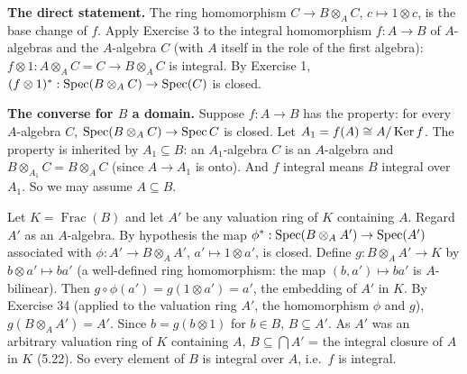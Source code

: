 \documentclass[11pt]{article}
\begin{document}
\pf
\textbf{The direct statement.} The ring homomorphism $C\to B\otimes_AC$, $c\mapsto1\otimes c$, is the base change of $f$. Apply Exercise 3 to the integral homomorphism $f:A\to B$ of $A$-algebras and the $A$-algebra $C$ (with $A$ itself in the role of the first algebra): $f\otimes1:A\otimes_AC=C\to B\otimes_AC$ is integral. By Exercise 1, $(f\otimes1)^*:\operatorname{Spec}(B\otimes_AC)\to\operatorname{Spec}(C)$ is closed.

\textbf{The converse for $B$ a domain.} Suppose $f:A\to B$ has the property: for every $A$-algebra $C$, $\operatorname{Spec}(B\otimes_AC)\to\operatorname{Spec} C$ is closed. Let $A_1=f(A)\cong A/\operatorname{Ker} f$. The property is inherited by $A_1\subseteq B$: an $A_1$-algebra $C$ is an $A$-algebra and $B\otimes_{A_1}C=B\otimes_AC$ (since $A\to A_1$ is onto). And $f$ integral means $B$ integral over $A_1$. So we may assume $A\subseteq B$.

Let $K=\operatorname{Frac}(B)$ and let $A'$ be any valuation ring of $K$ containing $A$. Regard $A'$ as an $A$-algebra. By hypothesis the map $\phi^*:\operatorname{Spec}(B\otimes_AA')\to\operatorname{Spec}(A')$ associated with $\phi:A'\to B\otimes_AA'$, $a'\mapsto1\otimes a'$, is closed. Define $g:B\otimes_AA'\to K$ by $b\otimes a'\mapsto ba'$ (a well-defined ring homomorphism: the map $(b,a')\mapsto ba'$ is $A$-bilinear). Then $g\circ\phi(a')=g(1\otimes a')=a'$, the embedding of $A'$ in $K$. By Exercise 34 (applied to the valuation ring $A'$, the homomorphism $\phi$ and $g$), $g(B\otimes_AA')=A'$. Since $b=g(b\otimes1)$ for $b\in B$, $B\subseteq A'$. As $A'$ was an arbitrary valuation ring of $K$ containing $A$, $B\subseteq\bigcap A'$ = the integral closure of $A$ in $K$ (5.22). So every element of $B$ is integral over $A$, i.e.\ $f$ is integral.
\end{document}
